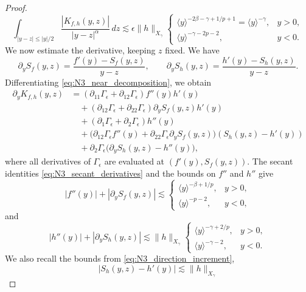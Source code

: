 \documentclass[11pt]{amsart}
\theoremstyle{definition}
\theoremstyle{remark}
\numberwithin{equation}{section}
\newcommand{\ang}[1]{\langle #1 \rangle}
\begin{document}
\begin{proof}
\begin{equation}\label{eq:N3_near_value}
    \int_{|y-z|\le |y|/2}\frac{|K_{f,h}(y,z)|}{|y-z|^\alpha}\,dz
    \lesssim\epsilon\|h\|_{X_\gamma}
    \begin{cases}
        \ang{y}^{-2\beta-\gamma+1/p+1}=\ang{y}^{-\gamma}, & y>0,\\
        \ang{y}^{-\gamma-2p-2}, & y<0.
    \end{cases}
\end{equation}
We now estimate the derivative, keeping $z$ fixed. We have
\begin{equation}\label{eq:N3_secant_derivatives}
    \partial_yS_f(y,z)=\frac{f'(y)-S_f(y,z)}{y-z},\qquad
    \partial_yS_h(y,z)=\frac{h'(y)-S_h(y,z)}{y-z}.
\end{equation}
Differentiating \eqref{eq:N3_near_decomposition}, we obtain
\begin{equation}\label{eq:N3_near_integrand_derivative}
\begin{aligned}
    \partial_yK_{f,h}(y,z)
    &=(\partial_{11}\Gamma_\epsilon+\partial_{12}\Gamma_\epsilon)f''(y)h'(y)\\
    &\quad +(\partial_{12}\Gamma_\epsilon+\partial_{22}\Gamma_\epsilon)\partial_yS_f(y,z)h'(y)\\
    &\quad +(\partial_1\Gamma_\epsilon+\partial_2\Gamma_\epsilon)h''(y)\\
    &\quad +\bigl(\partial_{12}\Gamma_\epsilon f''(y)+\partial_{22}\Gamma_\epsilon\partial_yS_f(y,z)\bigr)
        (S_h(y,z)-h'(y))\\
    &\quad +\partial_2\Gamma_\epsilon\bigl(\partial_yS_h(y,z)-h''(y)\bigr),
\end{aligned}
\end{equation}
where all derivatives of $\Gamma_\epsilon$ are evaluated at $(f'(y),S_f(y,z))$.
The secant identities \eqref{eq:N3_secant_derivatives} and the bounds on $f''$ and $h''$ give
\[
    |f''(y)|+|\partial_yS_f(y,z)|\lesssim
    \begin{cases}
        \ang{y}^{-\beta+1/p}, & y>0,\\
        \ang{y}^{-p-2}, & y<0,
    \end{cases}
\]
and
\[
    |h''(y)|+|\partial_yS_h(y,z)|\lesssim\|h\|_{X_\gamma}
    \begin{cases}
        \ang{y}^{-\gamma+2/p}, & y>0,\\
        \ang{y}^{-\gamma-2}, & y<0.
    \end{cases}
\]
We also recall the bounds from \eqref{eq:N3_direction_increment},
\[
    |S_h(y,z)-h'(y)|\lesssim\|h\|_{X_\gamma}
\]
\end{proof}
\end{document}

